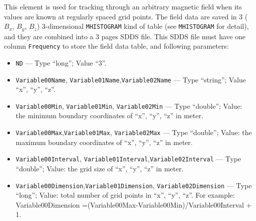This element is used for tracking through an arbitrary magnetic field
when its values are known at regularly spaced grid points. The field
data are saved in 3 ($B_x$, $B_y$, $B_z$) 3-dimensional
\verb|MHISTOGRAM| kind of table (see \verb|MHISTOGRAM| for detail),
and they are combined into a 3 pages SDDS file. This SDDS file must
have one column \verb|Frequency| to store the field data table, and
following parameters:

\begin{itemize} 
\item \verb|ND| --- Type ``long''; Value ``3''.
\item \verb|Variable00Name|, \verb|Variable01Name|,\verb|Variable02Name| 
      --- Type ``string''; Value ``x'', ``y'', ``z''.
\item \verb|Variable00Min|, \verb|Variable01Min|, \verb|Variable02Min|
      --- Type ``double''; Value: the minimum boundary coordinates of
      ``x'', ``y'', ``z'' in meter.
\item \verb|Variable00Max|,\verb|Variable01Max|, \verb|Variable02Max| 
      --- Type ``double''; Value: the maximum boundary coordinates of 
      ``x'', ``y'', ``z'' in meter.
\item \verb|Variable00Interval|, \verb|Variable01Interval|,\verb|Variable02Interval|
      --- Type ``double''; Value: the grid size of ``x'', ``y'', ``z'' in meter.  
\item \verb|Variable00Dimension|,\verb|Variable01Dimension|, \verb|Variable02Dimension|
      --- Type ``long''; Value: total number of grid points in ``x'', ``y'', ``z''. 
      For example: Variable00Dimension =(Variable00Max-Variable00Min)/Variable00Interval + 1.  
\end{itemize}
